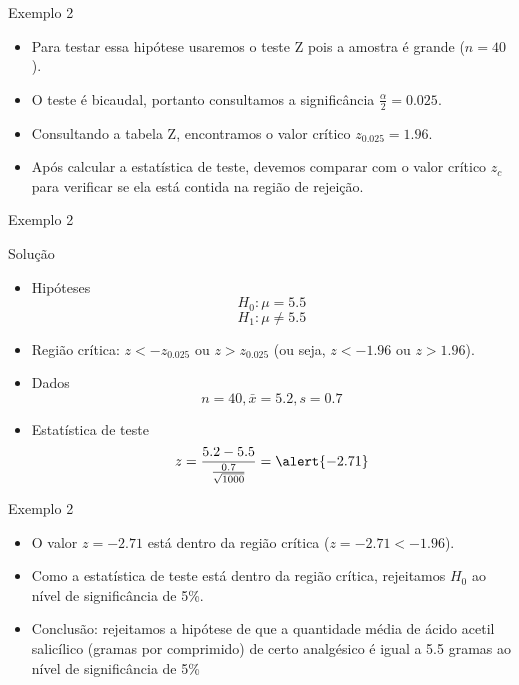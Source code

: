 \documentclass{beamer}
\begin{document}
\begin{frame}{Exemplo 2}
  \begin{itemize}
  \item Para testar essa hipótese usaremos o teste Z pois a amostra é
    grande ($n=40$).
  \item O teste é bicaudal, portanto consultamos a significância
    \alert{$\frac{\alpha}{2} = 0.025$}.
  \item Consultando a tabela Z, encontramos o valor crítico
    \alert{$z_{0.025} = 1.96$}.
  \item Após calcular a estatística de teste, devemos comparar com o
    valor crítico $z_c$ para verificar se ela está contida na região
    de rejeição.
  \end{itemize}
\end{frame}

\begin{frame}{Exemplo 2}
  \begin{block}{Solução}
    \begin{itemize}
    \item Hipóteses
      \begin{displaymath}
        H_0: \mu = 5.5
      \end{displaymath}
      \begin{displaymath}
        H_1: \mu \ne 5.5
      \end{displaymath}
    \item Região crítica: $z<-z_{0.025}$ ou $z>z_{0.025}$ (ou seja,
      \alert{$z<-1.96$ ou $z>1.96$}).
    \item Dados
      \begin{displaymath}
        n=40, \bar{x} = 5.2, s = 0.7
      \end{displaymath}
    \item Estatística de teste
      \begin{displaymath}
        z = \frac{5.2 - 5.5}{\frac{0.7}{\sqrt{1000}}} = \alert{-2.71}
      \end{displaymath}
    \end{itemize}
  \end{block}
\end{frame}

\begin{frame}{Exemplo 2}
  \begin{itemize}
  \item O valor $z=-2.71$ está dentro da região crítica ($z=-2.71 < -1.96$).
  \item Como a estatística de teste está dentro da região crítica,
    rejeitamos $H_0$ ao nível de significância de 5\%.
  \item Conclusão: rejeitamos a hipótese de que a quantidade média de
    ácido acetil salicílico (gramas por comprimido) de certo
    analgésico é igual a 5.5 gramas ao nível de significância de 5\%
  \end{itemize}
\end{frame}
\end{document}
